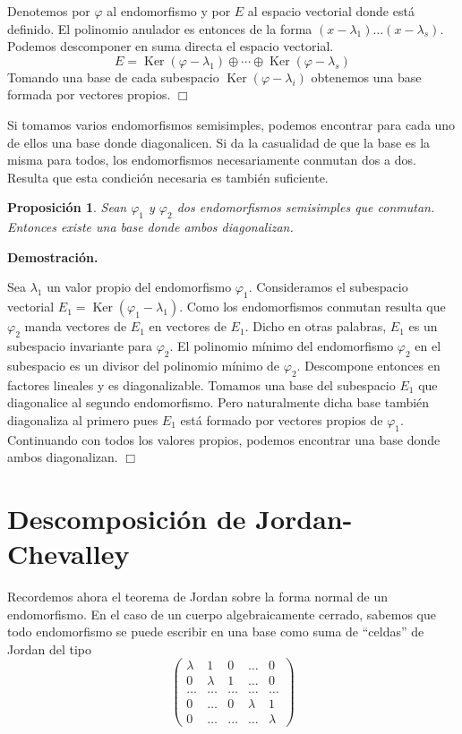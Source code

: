 \documentclass[a4paper,draft,12pt]{article}
\newtheorem{propo}[teo]{Proposición}%
\newcommand{\dem}{\noindent \textbf{Demostración. }\vspace{0.3 cm}}%
\newcommand{\fin}{ $\Box $ \vspace{0.4 cm}}
\DeclareMathOperator{\Ker}{Ker}%
\begin{document}
\smallskip

Denotemos por $\varphi$ al endomorfismo y por $E$ al espacio vectorial donde está definido.  El polinomio anulador es entonces de la forma $(x- \lambda_1) \dots(x- \lambda_s)$. Podemos descomponer en suma directa el espacio vectorial.
$$
E= \Ker(\varphi- \lambda_1) \oplus \cdots \oplus \Ker(\varphi-\lambda_s)
$$
Tomando una base de cada subespacio $\Ker(\varphi-\lambda_i)$ obtenemos una base formada por vectores propios. \fin

Si tomamos varios endomorfismos semisimples, podemos encontrar para cada uno de ellos una base donde diagonalicen.  Si da la casualidad de que la base es la misma para todos, los endomorfismos necesariamente conmutan dos a dos.  Resulta que esta condición necesaria es también suficiente.

\begin{propo}

Sean $\varphi_1$ y $\varphi_2$ dos endomorfismos semisimples que conmutan.  Entonces existe una base donde ambos diagonalizan.

\end{propo}

\dem

Sea $\lambda_1$ un valor propio del endomorfismo $\varphi_1$.  Consideramos el subespacio vectorial $E_1=\Ker(\varphi_1 - \lambda_1)$.  Como los endomorfismos conmutan resulta que $\varphi_2$ manda vectores de $E_1$ en vectores de $E_1$.  Dicho en otras palabras, $E_1$ es un subespacio invariante para $\varphi_2$. El polinomio mínimo del endomorfismo $\varphi_2$ en el subespacio es un divisor del polinomio mínimo de $\varphi_2$.  Descompone entonces en factores lineales y es diagonalizable.  Tomamos una base del subespacio $E_1$ que diagonalice al segundo endomorfismo.  Pero naturalmente dicha base también diagonaliza al primero pues $E_1$ está formado por vectores propios de $\varphi_1$.  Continuando con todos los valores propios, podemos encontrar una base donde ambos diagonalizan. \fin

\newpage

\section{Descomposición de Jordan-Chevalley}

Recordemos ahora el teorema de Jordan sobre  la forma normal de un endomorfismo. En el caso de un cuerpo algebraicamente cerrado, sabemos que todo endomorfismo se puede escribir en una base como suma de ``celdas'' de Jordan del tipo
$$
\begin{pmatrix}
\lambda & 1& 0 & \dots & 0 \\
0  & \lambda & 1 & \dots & 0 \\
\dots & \dots & \dots & \dots & \dots\\
0 & \dots & 0 & \lambda & 1 \\
0 & \dots & \dots & \dots & \lambda
\end{pmatrix}
$$
\end{document}
